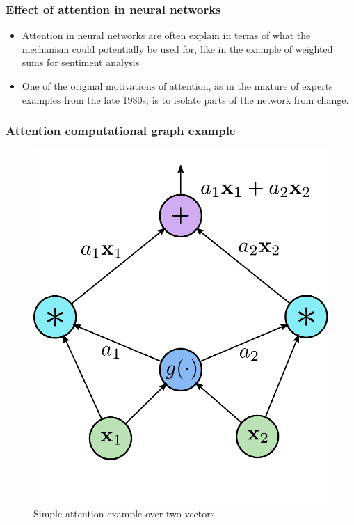 \documentclass{beamer}
\begin{document}
  \begin{frame}
    \frametitle{Effect of attention in neural networks}
    \begin{itemize}
    \item Attention in neural networks are often explain in terms of what the mechanism could potentially be used for, like in the example of weighted sums for sentiment analysis
    \item One of the original motivations of attention, as in the mixture of experts examples from the late 1980s, is to isolate parts of the network from change.
    \end{itemize}

  \end{frame}
\begin{frame}
    \frametitle{Attention computational graph example}
      \begin{figure}
        \includegraphics[scale=0.4]{attention_credit_assignment_ops}
        \caption{Simple attention example over two vectors}
      \end{figure}
\end{frame}
\end{document}
